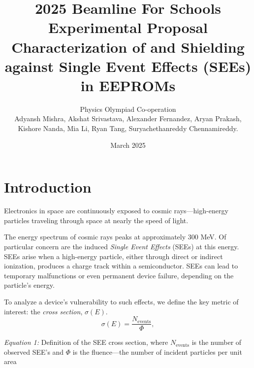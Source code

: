 \documentclass{article}
\title{2025 Beamline For Schools Experimental Proposal 
{\Large\titlefontish Characterization of and Shielding against Single Event Effects (SEEs) in EEPROMs}   
\vspace{-1em}
}
\author{\large Physics Olympiad Co-operation \\

{\normalfont\large
Adyansh Mishra,  
Akshat Srivastava,
Alexander Fernandez,  
Aryan Prakash,  
Kishore Nanda,
Mia Li,
Ryan Tang,  
Suryachethanreddy Chennamireddy.  
}
}
\date{March 2025}
\begin{document}
\setcounter{section}{1}


\maketitle

\pagestyle{fancynotes}

\vspace*{-5.5em}
\part{Introduction}

Electronics in space are continuously exposed to cosmic rays—high-energy particles
traveling through space at nearly the speed of light. 

The energy spectrum of cosmic rays peaks at approximately 300 MeV. Of particular concern are the induced \textit{Single Event Effects} (SEEs) at this energy.
SEEs arise when a high-energy particle, either through direct or indirect ionization, produces a charge track within a semiconductor. SEEs can lead to temporary malfunctions or even permanent device failure, depending on the particle's energy.

To analyze a device's vulnerability to such effects, we define the key metric of interest: the \textit{cross section}, $\sigma(E)$.
\begin{equation}
    \sigma (E) = \frac{N_{\text{events}}}{\Phi}, \tag{1}
    \label{eq: sat-cross-section}
\end{equation}

\textit{Equation 1:} Definition of the SEE cross section, where $N_{\text{events}}$ is the number of observed SEE's and $\Phi$ is the fluence---the number of incident
particles per unit area
\end{document}
